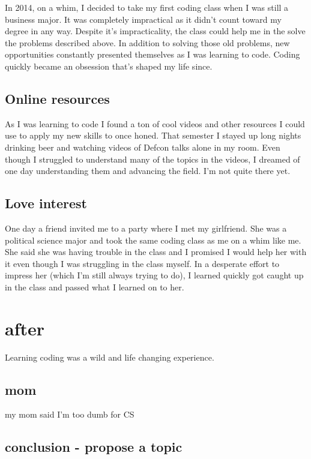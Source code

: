\documentclass[titlepage]{article}
\begin{document}
In 2014, on a whim, I decided to take my first coding class when I was still a business major. It was completely impractical as it didn't count toward my degree in any way. Despite it's impracticality, the class could help me in the solve the problems described above. In addition to solving those old problems, new opportunities constantly presented themselves as I was learning to code. Coding quickly became an obsession that's shaped my life since.

\subsection{Online resources}

As I was learning to code I found a ton of cool videos and other resources I could use to apply my new skills to once honed. That semester I stayed up long nights drinking beer and watching videos of Defcon talks alone in my room. Even though I struggled to understand many of the topics in the videos, I dreamed of one day understanding them and advancing the field. I'm not quite there yet. 

\subsection{Love interest}

One day a friend invited me to a party where I met my girlfriend. She was a political science major and took the same coding class as me on a whim like me. She said she was having trouble in the class and I promised I would help her with it even though I was struggling in the class myself. In a desperate effort to impress her (which I'm still always trying to do), I learned quickly got caught up in the class and passed what I learned on to her. 

\section{after}

Learning coding was a wild and life changing experience. 

\subsection{mom}

my mom said I'm too dumb for CS

\subsection{conclusion - propose a topic}
\end{document}

